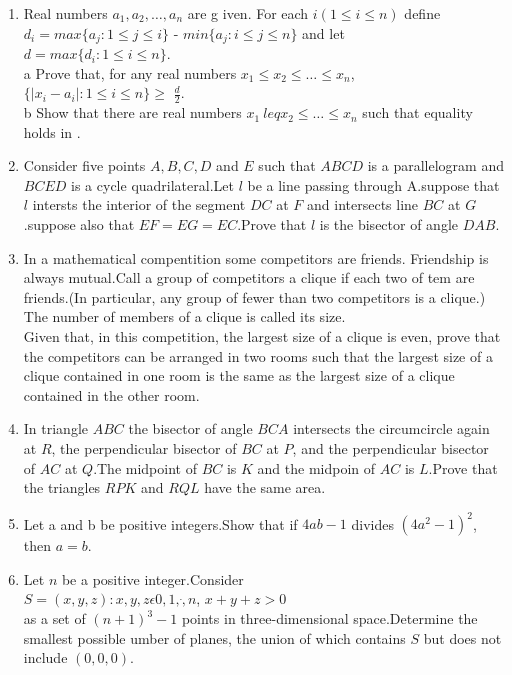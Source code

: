 \documentclass[12pt,-letter paper]{article}                           \usepackage{gvv}
\begin{document}
\begin{enumerate}
	\item Real numbers $a_1, a_2, \dots, a_n$ are g    iven. For each $i(1 \leq i \leq n)$ define \\
$d_i=max \{a_j : 1 \leq j \leq i\}$ - $min\{a_j : i \leq j \leq n\}$ and let \\
$d = max\{d_i : 1 \leq i \leq n\}$.\\
 \brak a Prove that, for any real numbers $x_1 \leq x_2 \leq \dots \leq x_n$, \\
$\{ | x_i - a_i | : 1 \leq  i \leq n \} \geq$  $\frac {d}{2}$. \brak * \\
\brak b Show that there are real numbers $x_1 \    leq x_2 \leq \dots \leq x_n$ such that equality     holds in \brak *.
\item Consider five points $A,B,C,D$ and $E$ such that $ABCD$ is a parallelogram and $BCED$ is a cycle quadrilateral.Let $l$ be a line passing through A.suppose that $l$ intersts the interior of the segment $DC$ at $F$ and intersects line $BC$ at $G$.suppose also that $EF=EG=EC$.Prove that $l$ is the bisector of angle $DAB$.
\item In a mathematical compentition some competitors are friends. Friendship is always mutual.Call a group of competitors a clique if each two of tem are friends.(In particular, any group of fewer than two competitors is a clique.) The number of members of a clique is called its size.\\
	Given that, in this competition, the largest size of a clique is even, prove that the competitors can be arranged in two rooms such that the largest size of a clique contained in one room is the same as the largest size of a clique contained in the other room.
\item In triangle $ABC$ the bisector of angle $BCA$ intersects the circumcircle again at $R$, the perpendicular bisector of $BC$ at $P$, and the perpendicular bisector of $AC$ at $Q$.The midpoint of $BC$ is $K$ and the midpoin of $AC$ is $L$.Prove that the triangles $RPK$ and $RQL$ have the same area.
\item Let a and b be positive integers.Show that if $4ab-1$ divides $(4a^2-1)^2$, then $a=b$.
\item Let $n$ be a positive integer.Consider\\
	$S={(x,y,z)} : {x,y,z} \epsilon {0,1,\dot,n}$, ${x+y+z>0}$ \\
		as a set of $(n+1)^{3}-1$ points in three-dimensional space.Determine the smallest possible umber of planes, the union of which contains $S$ but does not include $(0,0,0)$.
\end{enumerate}
\end{document}
